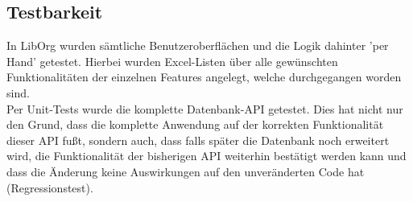 \subsection{Testbarkeit}
In LibOrg wurden sämtliche Benutzeroberflächen und die Logik dahinter 'per Hand' getestet. Hierbei wurden Excel-Listen über alle gewünschten Funktionalitäten der einzelnen Features angelegt, welche durchgegangen worden sind. \\
Per Unit-Tests wurde die komplette Datenbank-API getestet. Dies hat nicht nur den Grund, dass die komplette Anwendung auf der korrekten Funktionalität dieser API fußt, sondern auch, dass falls später die Datenbank noch erweitert wird, die Funktionalität der bisherigen API weiterhin bestätigt werden kann und dass die Änderung keine Auswirkungen auf den unveränderten Code hat (Regressionstest).
